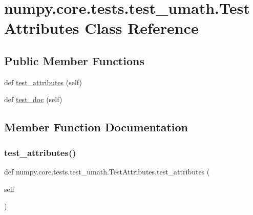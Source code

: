 \hypertarget{classnumpy_1_1core_1_1tests_1_1test__umath_1_1TestAttributes}{}\section{numpy.\+core.\+tests.\+test\+\_\+umath.\+Test\+Attributes Class Reference}
\label{classnumpy_1_1core_1_1tests_1_1test__umath_1_1TestAttributes}
\subsection*{Public Member Functions}
\begin{DoxyCompactItemize}
\item 
def \hyperlink{classnumpy_1_1core_1_1tests_1_1test__umath_1_1TestAttributes_a7c596fb8b93e663cf7fb13111387686d}{test\+\_\+attributes} (self)
\item 
def \hyperlink{classnumpy_1_1core_1_1tests_1_1test__umath_1_1TestAttributes_ab3bdf2fa04f721e1b07773647f6c2dd8}{test\+\_\+doc} (self)
\end{DoxyCompactItemize}


\subsection{Member Function Documentation}
\mbox{\label{classnumpy_1_1core_1_1tests_1_1test__umath_1_1TestAttributes_a7c596fb8b93e663cf7fb13111387686d}} 
\subsubsection{\texorpdfstring{test\+\_\+attributes()}{test\_attributes()}}
{\footnotesize\ttfamily def numpy.\+core.\+tests.\+test\+\_\+umath.\+Test\+Attributes.\+test\+\_\+attributes (\begin{DoxyParamCaption}\item[{}]{self }\end{DoxyParamCaption})}

